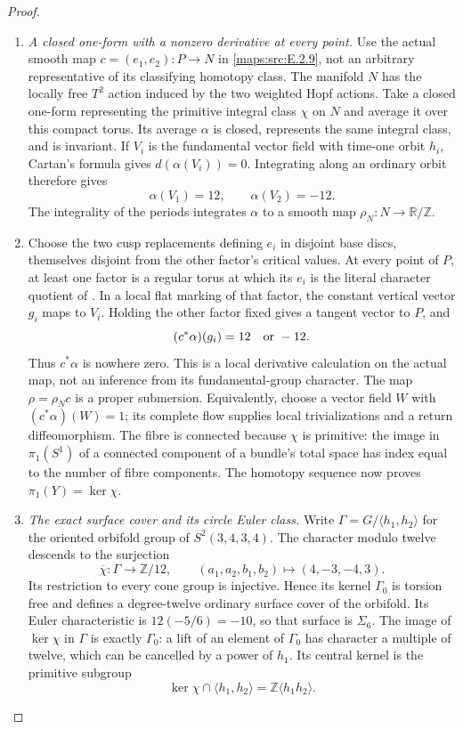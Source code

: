 \begin{proof}
\begin{enumerate}[label=\arabic*.,leftmargin=*]
\item \emph{A closed one-form with a nonzero derivative at every point.}
Use the actual smooth map $c=(e_1,e_2):P\to N$ in \ref{maps:src:E.2.9},
not an arbitrary representative of its classifying homotopy
class. The manifold $N$ has the locally free $T^2$ action
induced by the two weighted Hopf actions. Take a closed
one-form representing the primitive integral class $\chi$
on $N$ and average it over this compact torus. Its average
$\alpha$ is closed, represents the same integral class,
and is invariant. If $V_i$ is the fundamental vector field
with time-one orbit $h_i$, Cartan's formula gives
$d(\alpha(V_i))=0$. Integrating along an ordinary orbit
therefore gives
\[
                  \alpha(V_1)=12,\qquad \alpha(V_2)=-12.
 \tag{E.S25}\label{maps:eq:E.S25}
\]
The integrality of the periods integrates $\alpha$ to a
smooth map $\rho_N:N\to\mathbb R/\mathbb Z$.

\item Choose the two cusp replacements defining $e_i$ in disjoint
base discs, themselves disjoint from the other factor's
critical values. At every point of $P$, at least one factor
is a regular torus at which its $e_i$ is the literal character
quotient of . In a local flat marking of that factor,
the constant vertical vector $g_i$ maps to $V_i$. Holding
the other factor fixed gives a tangent vector to $P$, and
\[
                     (c^*\alpha)(g_i)=12\quad\hbox{or }-12.
\]
Thus $c^*\alpha$ is nowhere zero. This is a local derivative
calculation on the actual map, not an inference from its
fundamental-group character. The map $\rho=\rho_Nc$ is a
proper submersion. Equivalently, choose a vector field $W$
with $(c^*\alpha)(W)=1$; its complete flow supplies local
trivializations and a return diffeomorphism. The fibre is
connected because $\chi$ is primitive: the image in
$\pi_1(S^1)$ of a connected component of a bundle's total
space has index equal to the number of fibre components.
The homotopy sequence now proves $\pi_1(Y)=\ker\chi$.

\item \emph{The exact surface cover and its circle Euler class.}
Write $\Gamma=G/\langle h_1,h_2\rangle$ for the oriented
orbifold group of $S^2(3,4,3,4)$. The character modulo
twelve descends to the surjection
\[
 \overline\chi:\Gamma\longrightarrow\mathbb Z/12,
       \qquad(a_1,a_2,b_1,b_2)\longmapsto(4,-3,-4,3).
 \tag{E.S26}\label{maps:eq:E.S26}
\]
Its restriction to every cone group is injective. Hence its
kernel $\Gamma_0$ is torsion free and defines a degree-twelve
ordinary surface cover of the orbifold. Its Euler characteristic
is $12(-5/6)=-10$, so that surface is $\Sigma_6$. The image
of $\ker\chi$ in $\Gamma$ is exactly $\Gamma_0$: a lift of
an element of $\Gamma_0$ has character a multiple of twelve,
which can be cancelled by a power of $h_1$. Its central
kernel is the primitive subgroup
\[
 \ker\chi\cap\langle h_1,h_2\rangle
                =\mathbb Z\langle h_1h_2\rangle.
 \tag{E.S27}\label{maps:eq:E.S27}
\]


\end{enumerate}
\end{proof}
